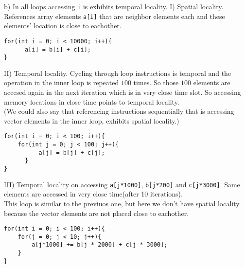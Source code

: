 \documentclass{article}
\begin{document}
\begin{flushleft}
b) In all loops accessing \texttt{i} is exhibits temporal locality.
I) Spatial locality. References array elements \texttt{a[i]} that are neighbor elements each and these elements' location is close to eachother. 
\begin{lstlisting}
for(int i = 0; i < 10000; i++){
      a[i] = b[i] + c[i];
}
\end{lstlisting}

II) Temporal locality. Cycling through loop instructions is temporal and the operation in the inner loop is repeated $100$ times. So those $100$ elements are accesed again in the next iteration which is in very close time slot. So accessing memory locations in close time points to temporal locality. \\
(We could also say that referencing instructions sequentially that is accessing vector elements in the inner loop, exhibits spatial locality.)
\begin{lstlisting}
for(int i = 0; i < 100; i++){
    for(int j = 0; j < 100; j++){
          a[j] = b[j] + c[j];
      }
}
\end{lstlisting}
III) Temporal locality on accessing \texttt{a[j*1000]}, \texttt{b[j*200]} and \texttt{c[j*3000]}. Same elements are accessed in very close time(after 10 iterations).\\
This loop is similar to the previuos one, but here we don't have spatial locality because the vector elements are not placed close to eachother.
\begin{lstlisting}
for(int i = 0; i < 100; i++){
    for(j = 0; j < 10; j++){
        a[j*1000] += b[j * 2000] + c[j * 3000];
    }
}
\end{lstlisting}
\end{flushleft}


\begin{flushleft}

\end{flushleft}
\newpage
\end{document}
